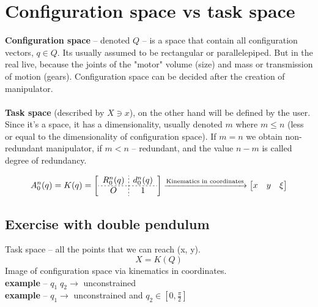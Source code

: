 \documentclass[12pt, a4paper]{extarticle}
\begin{document}
	\section{Configuration space vs task space}


	\textbf{Configuration space} -- denoted $Q$ -- is a space that contain all configuration vectors, $q \in Q$. Its usually assumed to be rectangular or parallelepiped. But in the real live, because the joints of the "motor" volume (size) and mass or transmission of motion (gears). Configuration space can be decided after the creation of manipulator.\\ \\
	\textbf{Task space}  (described by $X \ni x$), on the other hand will be defined by the user. Since it's a space, it has a dimensionality, usually denoted $m$ where $m \le n$ (less or equal to the dimensionality of configuration space). If $m = n$ we obtain non-redundant manipulator, if $m < n$ -- redundant, and the value $n-m$ is called degree of redundancy.

	\begin{equation}\label{key}
		A^n_0(q) = K(q) = \left[
		\begin{array}{c;{2pt/2pt}c}
			R^n_0(q) & d^n_0(q) \\ \hdashline[2pt/2pt]
			O & 1
		\end{array}
		\right] \xrightarrow{\text{Kinematics in coordinates}}
		\begin{bmatrix}
			x & y & \xi \\
		\end{bmatrix}
  	\end{equation}

	\subsection{Exercise with double pendulum}

	Task space -- all the points that we can reach (x, y). \\

	\begin{equation}\label{key}
		X = K(Q)
	\end{equation}
	Image of configuration space via kinematics in coordinates.
	\\
	\textbf{ example} -- $q_1\; q_2 \rightarrow$ unconstrained  \\
	\textbf{ example} -- $q_1 \rightarrow$ unconstrained and $q_2 \in [0, \tfrac{\pi}{2}]$



 
\end{document}
